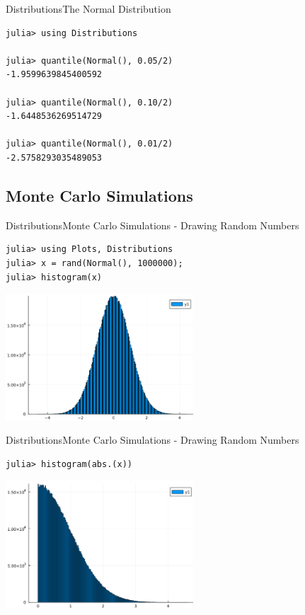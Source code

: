 \documentclass[11pt]{beamer}
\begin{document}
\begin{frame}[fragile]{Distributions}{The Normal Distribution}
\begin{lstlisting}
julia> using Distributions

julia> quantile(Normal(), 0.05/2)
-1.9599639845400592

julia> quantile(Normal(), 0.10/2)
-1.6448536269514729

julia> quantile(Normal(), 0.01/2)
-2.5758293035489053
\end{lstlisting}
\end{frame}

\subsection{Monte Carlo Simulations}
\begin{frame}[fragile]{Distributions}{Monte Carlo Simulations - Drawing Random Numbers}
\begin{lstlisting}
julia> using Plots, Distributions
julia> x = rand(Normal(), 1000000);
julia> histogram(x)
\end{lstlisting}
\begin{center}
\includegraphics[width=7cm]{images/histogram.png}
\end{center}
\end{frame}

\begin{frame}[fragile]{Distributions}{Monte Carlo Simulations - Drawing Random Numbers}
	\begin{lstlisting}
julia> histogram(abs.(x))
	\end{lstlisting}
	\begin{center}
		\includegraphics[width=7cm]{images/hist-abs-x.png}
	\end{center}
\end{frame}
\end{document}
